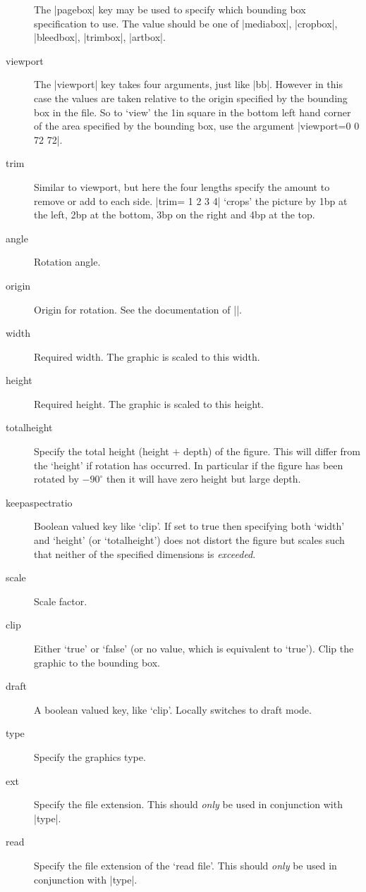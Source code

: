 \begin{description}
The |pagebox| key may be used to specify which bounding box specification to use.
The value should be one of
|mediabox|, |cropbox|, |bleedbox|, |trimbox|, |artbox|.
\item[viewport]
 The |viewport| key takes four arguments, just like
 |bb|. However in this case the values are taken relative to the
 origin specified by the bounding box in the file. So to `view' the
 1in square in the bottom left hand corner of the area specified by
 the bounding box, use the argument |viewport=0 0 72 72|.
\item[trim]
 Similar to viewport, but here the four lengths specify the
 amount to remove or add to each side. |trim= 1 2 3 4| `crops' the
 picture by 1bp at the left, 2bp at the bottom, 3bp on the right and
 4bp at the top.
\item[angle] Rotation angle.
\item[origin]
 Origin for rotation. See the documentation of |\rotatebox|.
\item[width] Required width. The
  graphic is scaled to this width.
\item[height] Required height. The
  graphic is scaled to this height.
\item[totalheight]
 Specify the total height (height $+$ depth) of the figure.
 This will differ from the `height' if rotation has occurred.
 In particular if the figure has been rotated by $-90^\circ$
 then it will have zero height but large depth.
\item[keepaspectratio]
 Boolean valued key like `clip'.
 If set to true then specifying both `width' and `height' (or
 `totalheight') does not distort the figure but scales such that
  neither of the specified dimensions is \emph{exceeded}.
\item[scale] Scale factor.
\item[clip] Either `true' or `false' (or no value, which is equivalent
  to `true'). Clip the graphic to the bounding box.
\item[draft] A boolean valued key, like `clip'. Locally switches to
  draft mode.
\item[type] Specify the graphics type.
\item[ext]  Specify the file extension. This should \emph{only} be
 used in conjunction with |type|.
\item[read] Specify the file extension of the `read file'. This
 should \emph{only} be used in conjunction with |type|.

\end{description}
